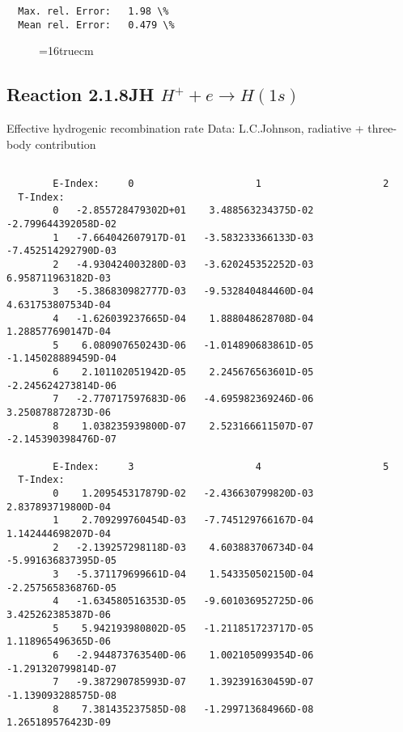 \documentclass[12pt,dvipdfmx]{article}
\begin{document}
{\begin{small}
\begin{verbatim}
  Max. rel. Error:   1.98 \%
  Mean rel. Error:   0.479 \%

\end{verbatim}\end{small}
\begin{figure} \label{H4-2.1.5FU}
\epsfxsize=16truecm
\end{figure}
\newpage

\subsection{
  Reaction 2.1.8JH  $ H^+ + e\rightarrow H(1s) $
}

   Effective hydrogenic recombination rate
   Data: L.C.Johnson, radiative + three-body contribution


\begin{small}\begin{verbatim}

        E-Index:     0                     1                     2
  T-Index:
        0   -2.855728479302D+01    3.488563234375D-02   -2.799644392058D-02
        1   -7.664042607917D-01   -3.583233366133D-03   -7.452514292790D-03
        2   -4.930424003280D-03   -3.620245352252D-03    6.958711963182D-03
        3   -5.386830982777D-03   -9.532840484460D-04    4.631753807534D-04
        4   -1.626039237665D-04    1.888048628708D-04    1.288577690147D-04
        5    6.080907650243D-06   -1.014890683861D-05   -1.145028889459D-04
        6    2.101102051942D-05    2.245676563601D-05   -2.245624273814D-06
        7   -2.770717597683D-06   -4.695982369246D-06    3.250878872873D-06
        8    1.038235939800D-07    2.523166611507D-07   -2.145390398476D-07

        E-Index:     3                     4                     5
  T-Index:
        0    1.209545317879D-02   -2.436630799820D-03    2.837893719800D-04
        1    2.709299760454D-03   -7.745129766167D-04    1.142444698207D-04
        2   -2.139257298118D-03    4.603883706734D-04   -5.991636837395D-05
        3   -5.371179699661D-04    1.543350502150D-04   -2.257565836876D-05
        4   -1.634580516353D-05   -9.601036952725D-06    3.425262385387D-06
        5    5.942193980802D-05   -1.211851723717D-05    1.118965496365D-06
        6   -2.944873763540D-06    1.002105099354D-06   -1.291320799814D-07
        7   -9.387290785993D-07    1.392391630459D-07   -1.139093288575D-08
        8    7.381435237585D-08   -1.299713684966D-08    1.265189576423D-09


\end{verbatim}
\end{small}}
\end{document}
